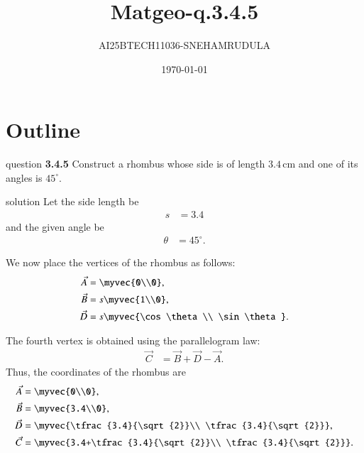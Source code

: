 \documentclass{beamer}
\title{Matgeo-q.3.4.5}
\author{AI25BTECH11036-SNEHAMRUDULA}
\date{\today}
\begin{document}
\begin{frame}
\titlepage
\end{frame}

\section*{Outline}
\begin{frame}{question}
    \textbf{3.4.5} Construct a rhombus whose side is of length $3.4 \, \text{cm}$ and one of its angles is $45^\circ$.
\end{frame}

\begin{frame}[allowframebreaks]{solution}
Let the side length be 
\begin{align}
    s &= 3.4                                            \label{eq:rhomb1}
\end{align}
and the given angle be
\begin{align}
    \theta &= 45^\circ.                                 \label{eq:rhomb2}
\end{align}

\noindent
We now place the vertices of the rhombus as follows:
\begin{align}
    \vec{A} &= \myvec{0\\0},                            \label{eq:rhombA}\\
    \vec{B} &= s\myvec{1\\0},                           \label{eq:rhombB}\\
    \vec{D} &= s\myvec{\cos\theta\\ \sin\theta}.        \label{eq:rhombD}
\end{align}

\framebreak %

\noindent
The fourth vertex is obtained using the parallelogram law:
\begin{align}
    \vec{C} &= \vec{B} + \vec{D} - \vec{A}.             \label{eq:rhombC}
\end{align}
\noindent
Thus, the coordinates of the rhombus are
\begin{align}
    \vec{A} &= \myvec{0\\0},                            \label{eq:rhombA2}\\
    \vec{B} &= \myvec{3.4\\0},                          \label{eq:rhombB2}\\
    \vec{D} &= \myvec{\tfrac{3.4}{\sqrt{2}}\\ \tfrac{3.4}{\sqrt{2}}}, 
                                                      \label{eq:rhombD2}\\
    \vec{C} &= \myvec{3.4+\tfrac{3.4}{\sqrt{2}}\\ \tfrac{3.4}{\sqrt{2}}}.
                                                      \label{eq:rhombC2}
\end{align}


\end{frame}
\end{document}
